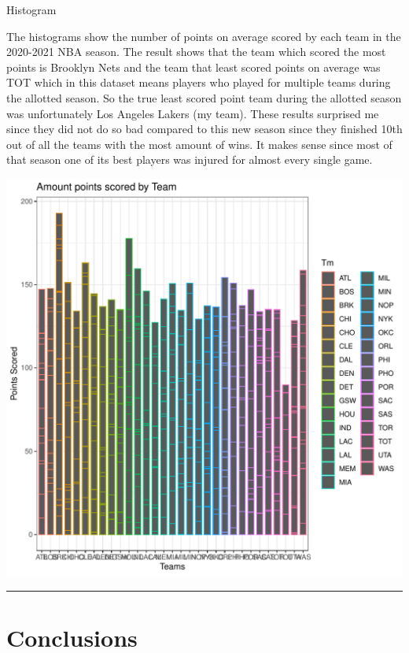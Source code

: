\documentclass[
]{article}
\begin{document}
Histogram

The histograms show the number of points on average scored by each team
in the 2020-2021 NBA season. The result shows that the team which scored
the most points is Brooklyn Nets and the team that least scored points
on average was TOT which in this dataset means players who played for
multiple teams during the allotted season. So the true least scored
point team during the allotted season was unfortunately Los Angeles
Lakers (my team). These results surprised me since they did not do so
bad compared to this new season since they finished 10th out of all the
teams with the most amount of wins. It makes sense since most of that
season one of its best players was injured for almost every single game.

\begin{center}\includegraphics{./figures/unnamed-chunk-5-1} \end{center}

\vspace{.2in}
\hrule
\vspace{.2in}

\hypertarget{conclusions}{%
\section{Conclusions}\label{conclusions}}
\end{document}
